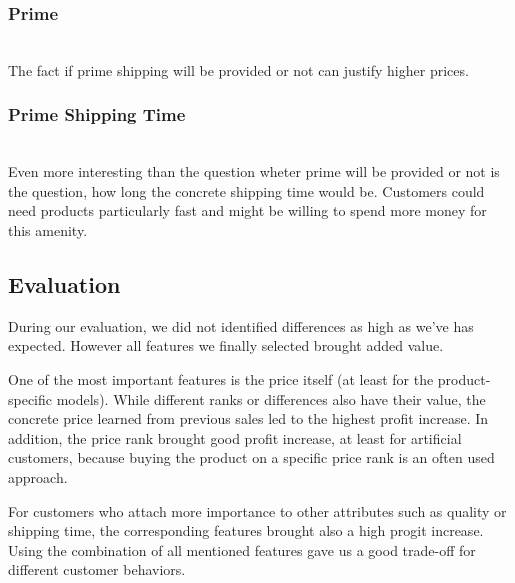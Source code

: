 	\subsubsection{Prime}
		~\\
		The fact if prime shipping will be provided or not can justify higher prices.
	\subsubsection{Prime Shipping Time}
		~\\
		Even more interesting than the question wheter prime will be provided or not is the question, how long the concrete shipping time would be. Customers could need products particularly fast and might be willing to spend more money for this amenity.
\subsection{Evaluation}
	During our evaluation, we did not identified differences as high as we've has expected. However all features we finally selected brought added value.

	One of the most important features is the price itself (at least for the product-specific models). While different ranks or differences also have their value, the concrete price learned from previous sales led to the highest profit increase. In addition, the price rank brought good profit increase, at least for artificial customers, because buying the product on a specific price rank is an often used approach.

	For customers who attach more importance to other attributes such as quality or shipping time, the corresponding features brought also a high progit increase. Using the combination of all mentioned features gave us a good trade-off for different customer behaviors.
